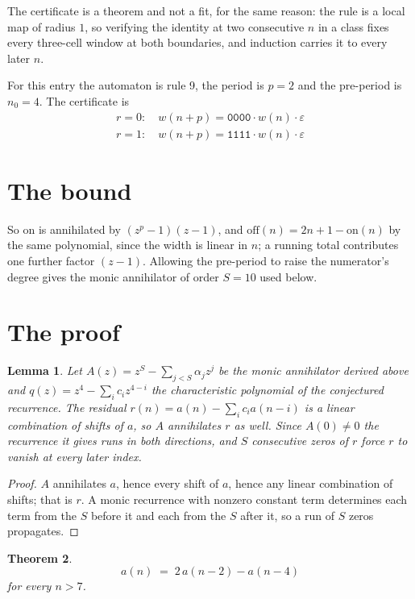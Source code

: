 \documentclass[11pt,a4paper]{article}
\theoremstyle{plain}
\newtheorem{theorem}{Theorem}
\newtheorem{lemma}[theorem]{Lemma}
\theoremstyle{definition}
\begin{document}
The certificate is a theorem and not a fit, for the same reason: the rule is a local map of
radius $1$, so verifying the identity at two consecutive $n$ in a class fixes every three-cell
window at both boundaries, and induction carries it to every later $n$.

For this entry the automaton is rule 9, the period is $p=2$ and the pre-period is $n_0=4$.
The certificate is
\begin{gather*}
r=0:\quad w(n+p) = \texttt{0000} \cdot w(n) \cdot \varepsilon \\
r=1:\quad w(n+p) = \texttt{1111} \cdot w(n) \cdot \varepsilon
\end{gather*}

\section{The bound}

So
$\mathrm{on}$ is annihilated by $(z^p-1)(z-1)$, and $\mathrm{off}(n)=2n+1-\mathrm{on}(n)$ by
the same polynomial, since the width is linear in $n$; a running total contributes one further
factor $(z-1)$. Allowing the pre-period to raise the numerator's degree gives the monic
annihilator of order $S=10$ used below.

\section{The proof}

\begin{lemma}\label{lem:crit}
Let $A(z)=z^S-\sum_{j<S}\alpha_jz^{j}$ be the monic annihilator derived above and
$q(z)=z^{4}-\sum_ic_iz^{4-i}$ the characteristic polynomial of the conjectured
recurrence. The residual $r(n)=a(n)-\sum_ic_ia(n-i)$ is a linear combination of shifts of $a$,
so $A$ annihilates $r$ as well. Since $A(0)\ne0$ the recurrence it gives runs in both
directions, and $S$ consecutive zeros of $r$ force $r$ to vanish at every later index.
\end{lemma}

\begin{proof}
$A$ annihilates $a$, hence every shift of $a$, hence any linear combination of shifts; that is
$r$. A monic recurrence with nonzero constant term determines each term from the $S$ before it
and each from the $S$ after it, so a run of $S$ zeros propagates.
\end{proof}

\begin{theorem}
\[
a(n)\;=\;2\,a(n-2) - a(n-4)
\]
for every $n>7$.
\end{theorem}
\end{document}
